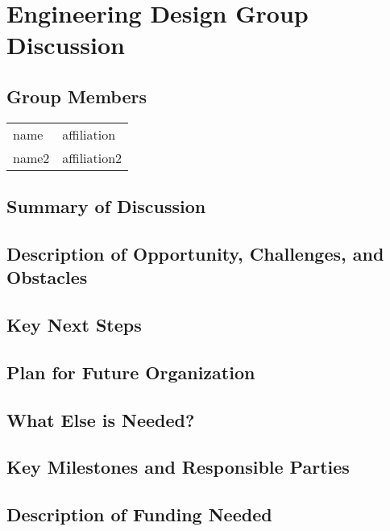 \section{Engineering Design Group Discussion}
\label{sec:appendix_eng_design}

\subsection{Group Members}
{\small
\begin{longtable}{ll}
   name            &  affiliation
\\ name2           &  affiliation2
\end{longtable}
}

\subsection{Summary of Discussion}

\subsection{Description of Opportunity, Challenges, and Obstacles}


\subsection{Key Next Steps}


\subsection{Plan for Future Organization}


\subsection{What Else is Needed?}


\subsection{Key Milestones and Responsible Parties}


\subsection{Description of Funding Needed}
